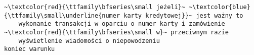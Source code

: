 \documentclass[a4paper,12pt]{book}
\begin{document}
     


\thispagestyle{empty}

\begin{lstlisting}[escapechar=~,morekeywords={koniec,warunku,to,przeciwnym,razie}]
~\textcolor{red}{\ttfamily\bfseries\small jeżeli}~ ~\textcolor{blue}{\ttfamily\small\underline{numer karty kredytowej}}~ jest ważny to
    wykonanie transakcji w oparciu o numer karty i zamówienie 
~\textcolor{red}{\ttfamily\bfseries\small w}~ przeciwnym razie
    wyświetlenie wiadomości o niepowodzeniu
koniec warunku
\end{lstlisting}
\end{document}

